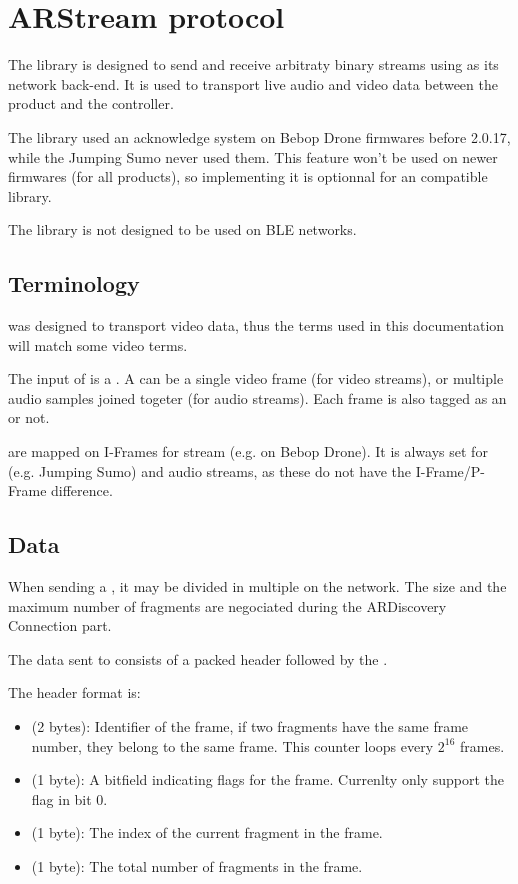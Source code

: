 \section{ARStream protocol}


The  library is designed to send and receive arbitraty binary streams using  as its network back-end. It is used to transport live audio and video data between the product and the controller.

The  library used an acknowledge system on Bebop Drone firmwares before 2.0.17, while the Jumping Sumo never used them. This feature won't be used on newer firmwares (for all products), so implementing it is optionnal for an  compatible library.


The  library is not designed to be used on BLE networks.

\subsection{Terminology}

 was designed to transport video data, thus the terms used in this documentation will match some video terms.

The input of  is a . A  can be a single video frame (for video streams), or multiple audio samples joined togeter (for audio streams). Each frame is also tagged as an  or not.

 are mapped on I-Frames for  stream (e.g. on Bebop Drone). It is always set for  (e.g. Jumping Sumo) and audio streams, as these do not have the I-Frame/P-Frame difference.

\subsection{Data}

When sending a , it may be divided in multiple  on the network. The size and the maximum number of fragments are negociated during the ARDiscovery Connection part.

The data sent to  consists of a packed header followed by the .

The header format is:
\begin{itemize}
\item{ (2 bytes): Identifier of the frame, if two fragments have the same frame number, they belong to the same frame. This counter loops every $2^{16}$ frames.}
\item{ (1 byte): A bitfield indicating flags for the frame. Currenlty only support the  flag in bit 0.}
\item{ (1 byte): The index of the current fragment in the frame.}
\item{ (1 byte): The total number of fragments in the frame.}
\end{itemize}

